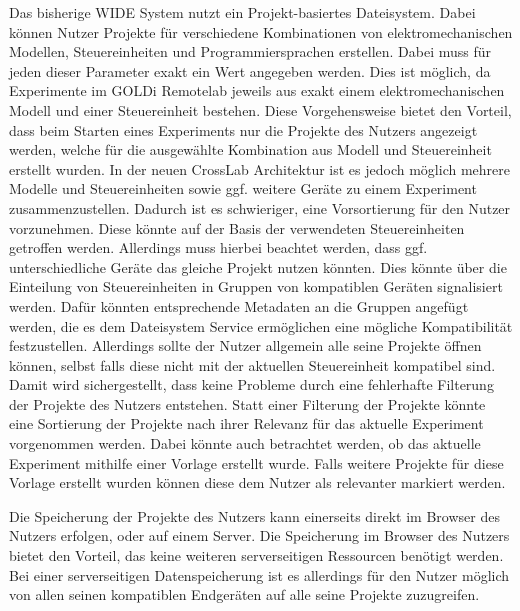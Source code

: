 Das bisherige WIDE System nutzt ein Projekt-basiertes Dateisystem. Dabei können Nutzer Projekte für verschiedene Kombinationen von elektromechanischen Modellen, Steuereinheiten und Programmiersprachen erstellen. Dabei muss für jeden dieser Parameter exakt ein Wert angegeben werden. Dies ist möglich, da Experimente im GOLDi Remotelab jeweils aus exakt einem elektromechanischen Modell und einer Steuereinheit bestehen. Diese Vorgehensweise bietet den Vorteil, dass beim Starten eines Experiments nur die Projekte des Nutzers angezeigt werden, welche für die ausgewählte Kombination aus Modell und Steuereinheit erstellt wurden. In der neuen CrossLab Architektur ist es jedoch möglich mehrere Modelle und Steuereinheiten sowie ggf. weitere Geräte zu einem Experiment zusammenzustellen. Dadurch ist es schwieriger, eine Vorsortierung für den Nutzer vorzunehmen. Diese könnte auf der Basis der verwendeten Steuereinheiten getroffen werden. Allerdings muss hierbei beachtet werden, dass ggf. unterschiedliche Geräte das gleiche Projekt nutzen könnten. Dies könnte über die Einteilung von Steuereinheiten in Gruppen von kompatiblen Geräten signalisiert werden. Dafür könnten entsprechende Metadaten an die Gruppen angefügt werden, die es dem Dateisystem Service ermöglichen eine mögliche Kompatibilität festzustellen. Allerdings sollte der Nutzer allgemein alle seine Projekte öffnen können, selbst falls diese nicht mit der aktuellen Steuereinheit kompatibel sind. Damit wird sichergestellt, dass keine Probleme durch eine fehlerhafte Filterung der Projekte des Nutzers entstehen. Statt einer Filterung der Projekte könnte eine Sortierung der Projekte nach ihrer Relevanz für das aktuelle Experiment vorgenommen werden. Dabei könnte auch betrachtet werden, ob das aktuelle Experiment mithilfe einer Vorlage erstellt wurde. Falls weitere Projekte für diese Vorlage erstellt wurden können diese dem Nutzer als relevanter markiert werden. 

Die Speicherung der Projekte des Nutzers kann einerseits direkt im Browser des Nutzers erfolgen, oder auf einem Server. Die Speicherung im Browser des Nutzers bietet den Vorteil, das keine weiteren serverseitigen Ressourcen benötigt werden. Bei einer serverseitigen Datenspeicherung ist es allerdings für den Nutzer möglich von allen seinen kompatiblen Endgeräten auf alle seine Projekte zuzugreifen.